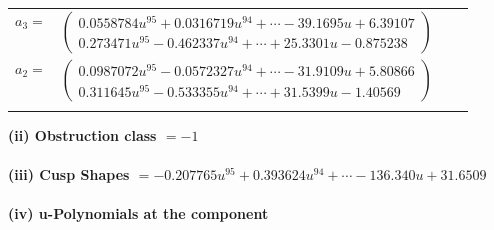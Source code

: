 \documentclass[1p]{elsarticle_modified}
\theoremstyle{definition}
\begin{document}
\begin{tabular}{m{7pt} m{180pt} m{7pt} m{180pt} }
\flushright $a_{3}=$&$\begin{pmatrix}0.0558784 u^{95}+0.0316719 u^{94}+\cdots-39.1695 u+6.39107\\0.273471 u^{95}-0.462337 u^{94}+\cdots+25.3301 u-0.875238\end{pmatrix}$ \\
\flushright $a_{2}=$&$\begin{pmatrix}0.0987072 u^{95}-0.0572327 u^{94}+\cdots-31.9109 u+5.80866\\0.311645 u^{95}-0.533355 u^{94}+\cdots+31.5399 u-1.40569\end{pmatrix}$\\&\end{tabular}
\flushleft \textbf{(ii) Obstruction class $= -1$}\\~\\
\flushleft \textbf{(iii) Cusp Shapes $= -0.207765 u^{95}+0.393624 u^{94}+\cdots-136.340 u+31.6509$}\\~\\
\newpage\renewcommand{\arraystretch}{1}
\flushleft \textbf{(iv) u-Polynomials at the component}\newline \\
\end{document}
